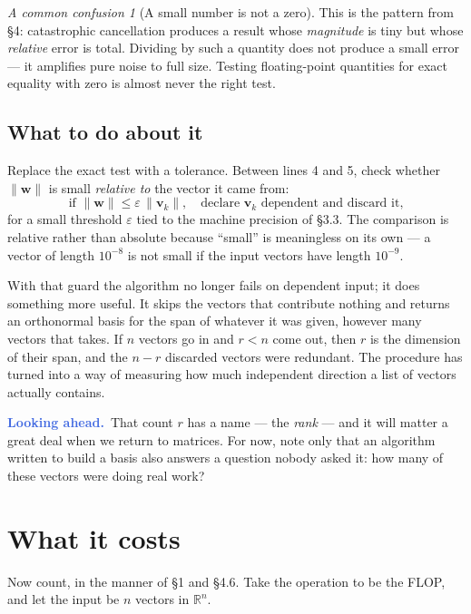\documentclass[11pt]{article}
\theoremstyle{plain}
\theoremstyle{definition}
\theoremstyle{remark}
\newtheorem*{warn}{A common confusion}
\newcommand{\lookahead}{\par\smallskip\noindent
  \textbf{\sffamily\textcolor{RoyalBlue}{Looking ahead.}}\ \ignorespaces}
\newcommand{\R}{\mathbb{R}}
\newcommand{\vc}[1]{\mathbf{#1}}
\newcommand{\norm}[1]{\lVert #1\rVert}
\begin{document}
\begin{warn}[A small number is not a zero]
This is the pattern from \S4: catastrophic cancellation produces a result whose
\emph{magnitude} is tiny but whose \emph{relative} error is total. Dividing by
such a quantity does not produce a small error --- it amplifies pure noise to
full size. Testing floating-point quantities for exact equality with zero is
almost never the right test.
\end{warn}

\subsection{What to do about it}
Replace the exact test with a tolerance. Between lines 4 and 5, check whether
$\norm{\vc{w}}$ is small \emph{relative to} the vector it came from:
\[
  \text{if } \norm{\vc{w}} \le \varepsilon\,\norm{\vc{v}_{k}},
  \quad\text{declare } \vc{v}_{k} \text{ dependent and discard it,}
\]
for a small threshold $\varepsilon$ tied to the machine precision of \S3.3. The
comparison is relative rather than absolute because ``small'' is meaningless on
its own --- a vector of length $10^{-8}$ is not small if the input vectors have
length $10^{-9}$.

With that guard the algorithm no longer fails on dependent input; it does
something more useful. It skips the vectors that contribute nothing and returns
an orthonormal basis for the span of whatever it was given, however many vectors
that takes. If $n$ vectors go in and $r<n$ come out, then $r$ is the dimension
of their span, and the $n-r$ discarded vectors were redundant. The procedure has
turned into a way of measuring how much independent direction a list of vectors
actually contains.

\lookahead That count $r$ has a name --- the \emph{rank} --- and it will matter a
great deal when we return to matrices. For now, note only that an algorithm
written to build a basis also answers a question nobody asked it: how many of
these vectors were doing real work?

\section{What it costs}
Now count, in the manner of \S1 and \S4.6. Take the operation to be the FLOP,
and let the input be $n$ vectors in $\R^{n}$.
\end{document}
